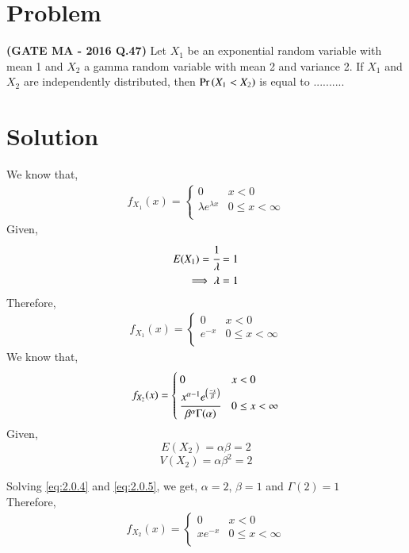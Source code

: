 \documentclass[journal,12pt,twocolumn]{IEEEtran}
\begin{document}
\section*{\textbf{Problem}}
\textbf{(GATE MA - 2016 Q.47)} Let $X_{1}$ be	an	exponential	random	variable with mean 1 and $X_{2}$ a gamma	random variable	with mean 2	and	variance 2.	If $X_{1}$ and $X_{2}$ are independently	distributed, then $\Pr\left(X_1 < X_2\right)$ is equal	to ..........	
\section*{\textbf{Solution}}
We know that,
\begin{align}
    f_{X_1}(x) = 
    \begin{cases}
    0   & x < 0\\
    \lambda e^{\lambda x} & 0\le x < \infty\\
    \end{cases}
\end{align}
Given, 
\begin{align}
   E(X_1)=\cfrac{1}{\lambda}&=1\\ 
   \implies \lambda &=1
\end{align}
Therefore,
\begin{align}
    f_{X_1}(x) = 
    \begin{cases}
    0   & x < 0\\
    e^{-x} & 0\le x < \infty\\
    \end{cases}
\end{align}
We know that,
\begin{align}
    f_{X_2}(x) = 
    \begin{cases}
    0   & x < 0\\
    \cfrac{x^{\alpha-1}e^{\left(\frac{-x}{\beta}\right)}}{\beta^{\alpha}\Gamma(\alpha)} & 0\le x < \infty\\
    \end{cases}
\end{align}
Given, 
\begin{equation}\label{eq:2.0.4}
    E(X_2)=\alpha \beta =2 
\end{equation}
\begin{equation}\label{eq:2.0.5}
    V(X_2)=\alpha \beta^{2}=2 
\end{equation}

Solving \ref{eq:2.0.4} and \ref{eq:2.0.5}, we get,
$\alpha=2$, $\beta=1$ and $\Gamma(2)=1$\\
Therefore,
\begin{align}
    f_{X_2}(x) = 
    \begin{cases}
    0   & x < 0\\
    xe^{-x} & 0\le x < \infty\\
    \end{cases}
\end{align}
\end{document}
